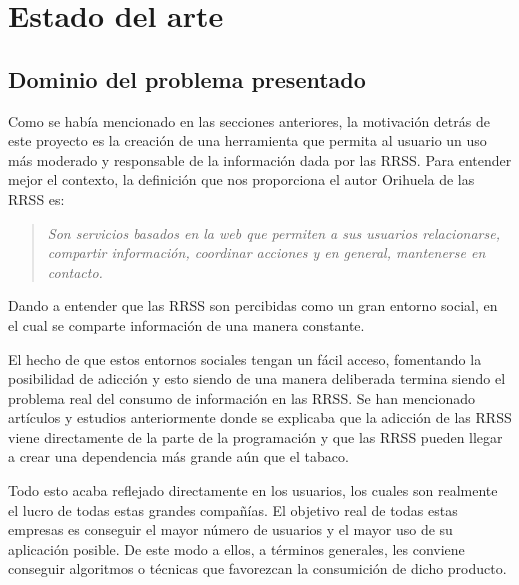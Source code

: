 \chapter{Estado del arte}\label{ch:estado-del-arte}

\section{Dominio del problema presentado}

Como se había mencionado en las secciones anteriores, la motivación detrás de este proyecto es la creación de una herramienta que permita al usuario un uso más moderado y responsable de la información dada por las \ac{RRSS}. Para entender mejor el contexto, la definición que nos proporciona el autor Orihuela de las \ac{RRSS} es:

\begin{quotation}
		\textit{Son servicios basados en la web que permiten a sus usuarios relacionarse, compartir información, coordinar acciones y en general, mantenerse en contacto. \cite{orihuela2008internet}}
\end{quotation}

Dando a entender que las \acs{RRSS} son percibidas como un gran entorno social, en el cual se comparte información de una manera constante.

\vspace{0.3cm}

El hecho de que estos entornos sociales tengan un fácil acceso, fomentando la posibilidad de adicción y esto siendo de una manera deliberada termina siendo el problema real del consumo de información en las \acs{RRSS}. Se han mencionado artículos y estudios anteriormente donde se explicaba que la adicción de las \acs{RRSS} viene directamente de la parte de la programación \cite{Social-Deliberately} y  que las \acs{RRSS} pueden llegar a crear una dependencia más grande aún que el tabaco. \cite{Tabaco-Study}

\vspace{0.3cm}

Todo esto acaba reflejado directamente en los usuarios, los cuales son realmente el lucro de todas estas grandes compañías. El objetivo real de todas estas empresas es conseguir el mayor número de usuarios y el mayor uso de su aplicación posible. De este modo a ellos, a términos generales, les conviene conseguir algoritmos o técnicas que favorezcan la consumición de dicho producto.


